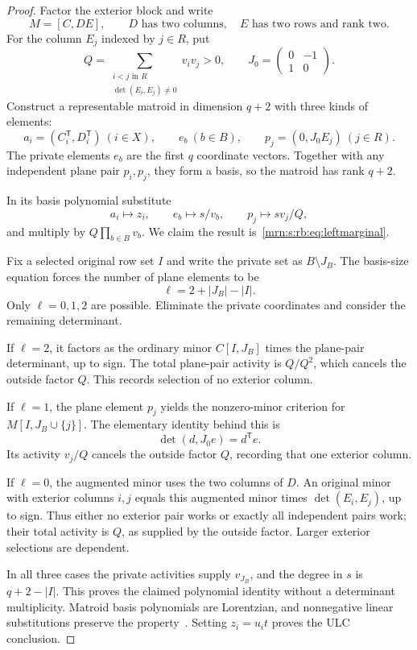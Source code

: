 \documentclass[11pt,a4paper]{article}
\theoremstyle{remark}\newtheorem{remark}[theorem]{Remark}
\begin{document}
\begin{proof}
Factor the exterior block and write
\[
 M=[C,DE],\qquad D\text{ has two columns},\quad
 E\text{ has two rows and rank two}.
\]
For the column $E_j$ indexed by $j\in R$, put
\[
 Q=\sum_{\substack{i<j\text{ in }R\\\det(E_i,E_j)\ne0}}v_iv_j>0,
 \qquad J_0=\begin{pmatrix}0&-1\\1&0\end{pmatrix}.
\]
Construct a representable matroid in dimension $q+2$ with three kinds of elements:
\[
 a_i=(C_i^{\mathsf T},D_i^{\mathsf T})\ (i\in X),\qquad
 e_b\ (b\in B),\qquad
 p_j=(0,J_0E_j)\ (j\in R).
\]
The private elements $e_b$ are the first $q$ coordinate vectors. Together with any independent plane pair $p_i,p_j$, they form a basis, so the matroid has rank $q+2$.

In its basis polynomial substitute
\begin{equation}\label{mrn:s:rb:eq:substitution}
 a_i\mapsto z_i,\qquad e_b\mapsto s/v_b,\qquad
 p_j\mapsto sv_j/Q,
\end{equation}
and multiply by $Q\prod_{b\in B}v_b$. We claim the result is~\eqref{mrn:s:rb:eq:leftmarginal}.

Fix a selected original row set $I$ and write the private set as $B\setminus J_B$. The basis-size equation forces the number of plane elements to be
\[
 \ell=2+|J_B|-|I|.
\]
Only $\ell=0,1,2$ are possible. Eliminate the private coordinates and consider the remaining determinant.

If $\ell=2$, it factors as the ordinary minor $C[I,J_B]$ times the plane-pair determinant, up to sign. The total plane-pair activity is $Q/Q^2$, which cancels the outside factor $Q$. This records selection of no exterior column.

If $\ell=1$, the plane element $p_j$ yields the nonzero-minor criterion for $M[I,J_B\cup\{j\}]$. The elementary identity behind this is
\[
 \det(d,J_0e)=d^{\mathsf T}e.
\]
Its activity $v_j/Q$ cancels the outside factor $Q$, recording that one exterior column.

If $\ell=0$, the augmented minor uses the two columns of $D$. An original minor with exterior columns $i,j$ equals this augmented minor times $\det(E_i,E_j)$, up to sign. Thus either no exterior pair works or exactly all independent pairs work; their total activity is $Q$, as supplied by the outside factor. Larger exterior selections are dependent.

In all three cases the private activities supply $v_{J_B}$, and the degree in $s$ is $q+2-|I|$. This proves the claimed polynomial identity without a determinant multiplicity. Matroid basis polynomials are Lorentzian, and nonnegative linear substitutions preserve the property~\cite{b:BH}. Setting $z_i=u_it$ proves the ULC conclusion.
\end{proof}
\end{document}
